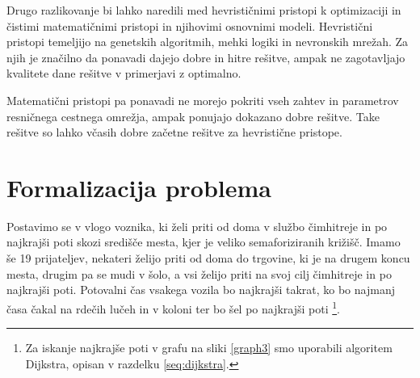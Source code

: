 \documentclass[a4paper, 12pt]{book}
\begin{document}
Drugo razlikovanje bi lahko naredili med hevristi\v cnimi pristopi k optimizaciji in \v cistimi matemati\v cnimi pristopi in njihovimi osnovnimi modeli. Hevristi\v cni pristopi temeljijo na genetskih algoritmih, mehki logiki in nevronskih mre\v zah. Za njih je zna\v cilno da ponavadi dajejo dobre in hitre re\v sitve, ampak ne zagotavljajo  kvalitete dane re\v sitve v primerjavi z optimalno.

Matemati\v cni pristopi pa ponavadi ne morejo pokriti vseh zahtev in parametrov resni\v cnega cestnega omre\v zja, ampak ponujajo dokazano dobre re\v sitve. Take re\v sitve so lahko v\v casih dobre za\v cetne re\v sitve za hevristi\v cne pristope.

\section{Formalizacija problema}
Postavimo se v vlogo voznika, ki \v zeli priti od doma v slu\v zbo \v cimhitreje in po najkraj\v si poti skozi sredi\v s\v ce mesta, kjer je veliko semaforiziranih kri\v zi\v s\v c. Imamo \v se 19 prijateljev, nekateri \v zelijo priti od doma do trgovine, ki je na drugem koncu mesta, drugim pa se mudi v \v solo, a vsi \v zelijo priti na svoj cilj \v cimhitreje in po najkraj\v si poti. Potovalni \v cas vsakega vozila bo najkraj\v si takrat, ko bo najmanj \v casa \v cakal na rde\v cih lu\v ceh in v koloni ter bo \v sel po najkraj\v si poti
\footnote{Za iskanje najkraj\v se poti v grafu na sliki \ref{graph3} smo uporabili algoritem Dijkstra, opisan v razdelku \ref{seq:dijkstra}.}.
\end{document}
